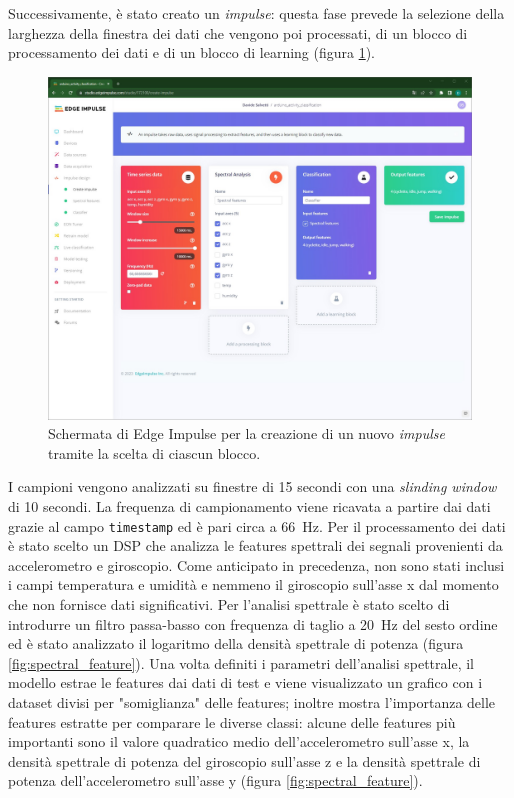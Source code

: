Successivamente, è stato creato un \textit{impulse}: questa fase prevede la selezione della larghezza della finestra dei dati che vengono poi processati, di un blocco di processamento dei dati e di un blocco di learning (figura \ref{fig:creazione_impulse}).
\begin{figure}[b!]
	\centering
	\includegraphics[width=0.5\linewidth]{./ImageFiles/creazione_impulse.jpg}
	\caption{Schermata di Edge Impulse per la creazione di un nuovo \textit{impulse} tramite la scelta di ciascun blocco.}
	\label{fig:creazione_impulse}
\end{figure}
I campioni vengono analizzati su finestre di 15 secondi con una \textit{slinding window} di 10 secondi. La frequenza di campionamento viene ricavata a partire dai dati grazie al campo \texttt{timestamp} ed è pari circa a \SI{66}{\hertz}.
Per il processamento dei dati è stato scelto un DSP che analizza le features spettrali dei segnali provenienti da accelerometro e giroscopio. Come anticipato in precedenza, non sono stati inclusi i campi temperatura e umidità e nemmeno il giroscopio sull'asse x dal momento che non fornisce dati significativi.
Per l'analisi spettrale è stato scelto di introdurre un filtro passa-basso con frequenza di taglio a \SI{20}{\hertz} del sesto ordine ed è stato analizzato il logaritmo della densità spettrale di potenza (figura \ref{fig:spectral_feature}). Una volta definiti i parametri dell'analisi spettrale, il modello estrae le features dai dati di test e viene visualizzato un grafico con i dataset divisi per "somiglianza" delle features; inoltre mostra l'importanza delle features estratte per comparare le diverse classi: alcune delle features più importanti sono il valore quadratico medio dell'accelerometro sull'asse x, la densità spettrale di potenza del giroscopio sull'asse z e la densità spettrale di potenza dell'accelerometro sull'asse y (figura \ref{fig:spectral_feature}).

